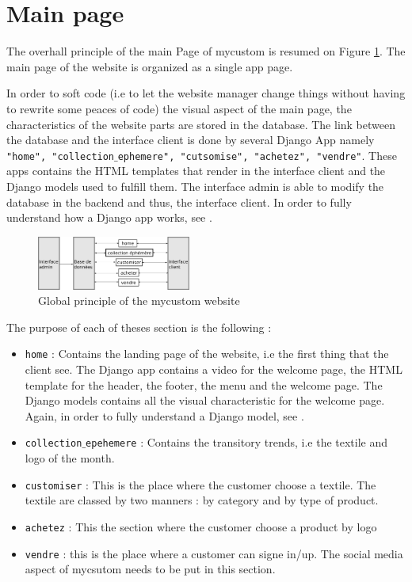 \section{Main page}

The overhall principle of the main Page of mycustom is resumed on Figure \ref{fig:principe}. The main page of the website is organized as a single app page. 

In order to soft code (i.e to let the website manager change things without having to rewrite some peaces of code) the visual aspect of the main page, the characteristics of the website parts are stored in the database. The link between the database and the interface client is done by several Django App namely \texttt{"home", "collection$\_$ephemere", "cutsomise", "achetez", "vendre"}. These apps contains the HTML templates that render in the interface client and the Django models used to fulfill them. The interface admin is able to modify the database in the backend and thus, the interface client. In order to fully understand how a Django app works, see \cite{Django, Django_doc}. 

\begin{figure}[!ht]
	\centering
	\includegraphics[width=0.45\textwidth]{mainPage/principe}
	\caption{Global principle of the mycustom website}
	\label{fig:principe}
\end{figure}

The purpose of each of theses section is the following : 

\begin{itemize}
	\item \texttt{home} : Contains the landing page of the website, i.e the first thing that the client see. The Django app contains a video for the welcome page, the HTML template for the header, the footer, the menu and the welcome page. The Django models contains all the visual characteristic for the welcome page. Again, in order to fully understand a Django model, see \cite{Django, Django_doc}.
	\item \texttt{collection$\_$epehemere} : Contains the transitory trends, i.e  the textile and logo of the month. 
	\item \texttt{customiser} : This is the place where the customer choose a textile. The textile are classed by two manners : by category and by type of product. 
	\item \texttt{achetez} : This the section where the customer choose a product by logo
	\item \texttt{vendre} : this is the place where a customer can signe in/up. The social media aspect of mycsutom needs to be put in this section. 
\end{itemize}

